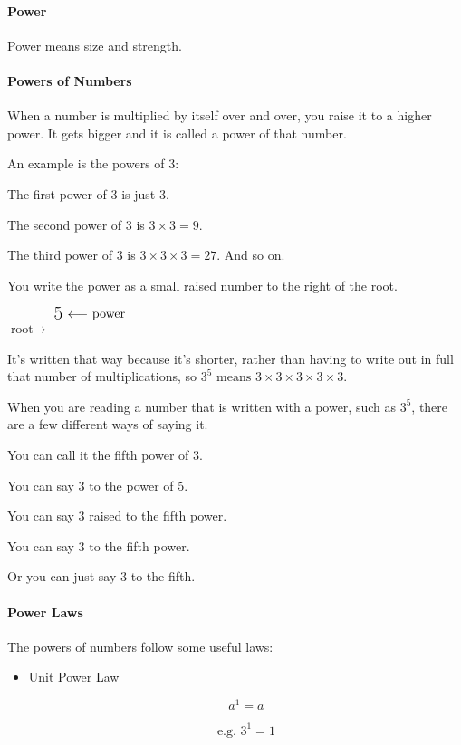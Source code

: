 \documentclass[12pt]{article}
\begin{document}
{\paragraph{Power}
Power means size and strength.

\paragraph{Powers of Numbers}
When a number is multiplied by itself over and over, you raise it to a higher power. It gets bigger and it is called a power of that number.

An example is the powers of 3:

The first power of 3 is just 3.

The second power of 3 is $3 \times 3 = 9.$

The third power of 3 is $3 \times 3 \times 3 = 27.$ And so on.

You write the power as a small raised number to the right of the root.

\begin{center}
$\text{root}\rightarrow$
{\fontsize{30}{34}}
$\raisebox{1.6ex}{\textsuperscript{{\fontsize{15}{20}\selectfont 5}}} \ \raisebox{2.7ex}{$\longleftarrow$\ }\raisebox{1.9ex}{\textsuperscript{\normalsize{\text{power}}}}$
\normalsize
\end{center}

It's written that way because it's shorter, rather than having to write out in full that number of multiplications, so $3^5 \text{ means }3 \times 3 \times 3 \times 3 \times 3.$

When you are reading a number that is written with a power, such as $3^5$, there are a few different ways of saying it.

You can call it the fifth power of 3.

You can say 3 to the power of 5.

You can say 3 raised to the fifth power.

You can say 3 to the fifth power.

Or you can just say 3 to the fifth.

\paragraph{Power Laws}
The powers of numbers follow some useful laws:
\begin{itemize}

\item Unit Power Law
\begin{Large}
$$a^1=a$$
\end{Large}
$$\text{e.g. }3^1=1$$


\end{itemize}}
\end{document}
